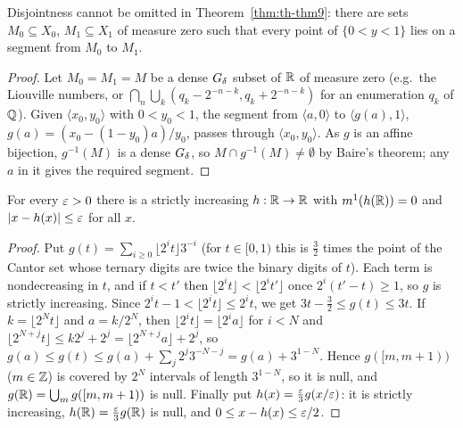\begin{proposition}\label{prop:th-example}
Disjointness cannot be omitted in Theorem~\ref{thm:th-thm9}: there are sets $M_0\subseteq X_0$, $M_1\subseteq X_1$ of measure zero
such that every point of $\{0<y<1\}$ lies on a segment from $M_0$ to $M_1$.
\end{proposition}
\begin{proof}
Let $M_0=M_1=M$ be a dense $G_\delta$ subset of $\mathbb{R}$ of measure zero (e.g.\ the Liouville numbers, or
$\bigcap_n\bigcup_k(q_k-2^{-n-k},q_k+2^{-n-k})$ for an enumeration $q_k$ of $\mathbb{Q}$). Given $\langle x_0,y_0\rangle$ with $0<y_0<1$, the
segment from $\langle a,0\rangle$ to $\langle g(a),1\rangle$, $g(a)=(x_0-(1-y_0)a)/y_0$, passes through $\langle x_0,y_0\rangle$. As $g$ is an affine
bijection, $g^{-1}(M)$ is a dense $G_\delta$, so $M\cap g^{-1}(M)\ne\emptyset$ by Baire's theorem; any $a$ in it gives the required segment.
\end{proof}

\begin{lemma}\label{lem:th-lemma25}
For every $\varepsilon>0$ there is a strictly increasing $h:\mathbb{R}\to\mathbb{R}$ with $m^1(h(\mathbb{R}))=0$ and $\lvert x-h(x)\rvert\le\varepsilon$ for all $x$.
\end{lemma}
\begin{proof}
Put $g(t)=\sum_{i\ge0}\lfloor2^it\rfloor3^{-i}$ (for $t\in[0,1)$ this is $\tfrac32$ times the point of the Cantor set whose
ternary digits are twice the binary digits of $t$). Each term is nondecreasing in $t$, and if $t<t'$ then
$\lfloor2^it\rfloor<\lfloor2^it'\rfloor$ once $2^i(t'-t)\ge1$, so $g$ is strictly increasing. Since
$2^it-1<\lfloor2^it\rfloor\le2^it$, we get $3t-\tfrac32\le g(t)\le3t$. If $k=\lfloor2^Nt\rfloor$ and $a=k/2^N$, then
$\lfloor2^it\rfloor=\lfloor2^ia\rfloor$ for $i<N$ and $\lfloor2^{N+j}t\rfloor\le k2^j+2^j=\lfloor2^{N+j}a\rfloor+2^j$, so
$g(a)\le g(t)\le g(a)+\sum_j2^j3^{-N-j}=g(a)+3^{1-N}$. Hence $g([m,m+1))$ ($m\in\mathbb{Z}$) is covered by $2^N$ intervals of
length $3^{1-N}$, so it is null, and $g(\mathbb{R})=\bigcup_mg([m,m+1))$ is null. Finally put $h(x)=\tfrac{\varepsilon}3g(x/\varepsilon)$: it is
strictly increasing, $h(\mathbb{R})=\tfrac{\varepsilon}3g(\mathbb{R})$ is null, and $0\le x-h(x)\le\varepsilon/2$.
\end{proof}

